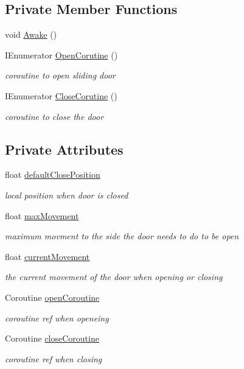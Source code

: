\subsection*{Private Member Functions}
\begin{DoxyCompactItemize}
\item 
void \mbox{\hyperlink{class_sliding_door_af7235e859e82cdf3dbedc926cf789623}{Awake}} ()
\item 
I\+Enumerator \mbox{\hyperlink{class_sliding_door_adb583a66e0b4eeb5e03e50a3d4d4e109}{Open\+Corutine}} ()
\begin{DoxyCompactList}\small\item\em coroutine to open sliding door \end{DoxyCompactList}\item 
I\+Enumerator \mbox{\hyperlink{class_sliding_door_adcfa4000b6eafa6ec8b6ec335dbd5efe}{Close\+Corutine}} ()
\begin{DoxyCompactList}\small\item\em coroutine to close the door \end{DoxyCompactList}\end{DoxyCompactItemize}
\subsection*{Private Attributes}
\begin{DoxyCompactItemize}
\item 
float \mbox{\hyperlink{class_sliding_door_ae98a84a3b0580b64ace05dd5ea8f6a2c}{default\+Close\+Position}}
\begin{DoxyCompactList}\small\item\em local position when door is closed \end{DoxyCompactList}\item 
float \mbox{\hyperlink{class_sliding_door_a88b13866a50815f6435905ad8f07888b}{max\+Movement}}
\begin{DoxyCompactList}\small\item\em maximum movment to the side the door needs to do to be open \end{DoxyCompactList}\item 
float \mbox{\hyperlink{class_sliding_door_aa1520830e43525a3b3f0ea3ac5891407}{current\+Movement}}
\begin{DoxyCompactList}\small\item\em the current movement of the door when opening or closing \end{DoxyCompactList}\item 
Coroutine \mbox{\hyperlink{class_sliding_door_a0f440064aa6ae61923c4a05c38a6a60d}{open\+Coroutine}}
\begin{DoxyCompactList}\small\item\em coroutine ref when openeing \end{DoxyCompactList}\item 
Coroutine \mbox{\hyperlink{class_sliding_door_adfdf9df55e4882d083680e2cde5016c5}{close\+Coroutine}}
\begin{DoxyCompactList}\small\item\em coroutine ref when closing \end{DoxyCompactList}\end{DoxyCompactItemize}
